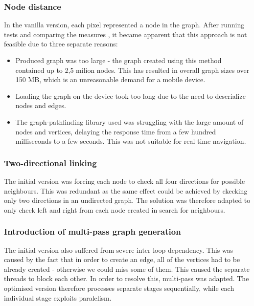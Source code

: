 \documentclass[main.tex]{subfiles}
\begin{document}
	\subsubsection{Node distance}
	In the vanilla version, each pixel represented a node in the graph. After running tests and comparing the measures , it became apparent that this approach is not feasible due to three separate reasons:
	
	\begin{itemize}
		\item Produced graph was too large - the graph created using this method contained up to 2,5 milion nodes. This has resulted in overall graph sizes over 150 MB, which is an unreasonable demand for a mobile device.
		\item Loading the graph on the device took too long due to the need to deserialize nodes and edges.
		\item The graph-pathfinding library used was struggling with the large amount of nodes and vertices, delaying the response time from a few hundred milliseconds to a few seconds. This was not suitable for real-time navigation.
	\end{itemize}
	

	\subsubsection{Two-directional linking}
	
	The initial version was forcing each node to check all four directions for possible neighbours. This was redundant as the same effect could be achieved by ckecking only two directions in an undirected graph. The solution was therefore adapted to only check left and right from each node created in search for neighbours.
	\subsubsection{Introduction of multi-pass graph generation}
	The initial version also suffered from severe inter-loop dependency. This was caused by the fact that in order to create an edge, all of the vertices had to be already created - otherwise we could miss some of them. This caused the separate threads to block each other. In order to resolve this, multi-pass was adapted.  The optimised version therefore processes separate stages sequentially, while each individual stage exploits paralelism.
\end{document}
